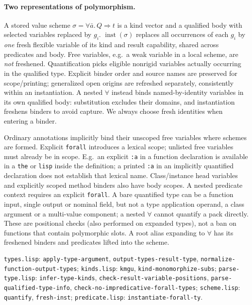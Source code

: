 \documentclass[11pt]{article}
\theoremstyle{definition}
\newcommand{\code}[1]{\texttt{#1}}
\newcommand{\src}[1]{\nolinkurl{#1}}
\begin{document}
\paragraph{Two representations of polymorphism.}
A stored value scheme $\sigma=\forall\bar a.\,Q\Rightarrow t$ is a kind
vector and a qualified body with selected variables replaced by $g_i$.
$\operatorname{inst}(\sigma)$ replaces all occurrences of each $g_i$ by
\emph{one} fresh flexible variable of its kind and result capability, shared
across predicates and body. Free variables, e.g.\ a weak variable in a local
scheme, are \emph{not} freshened. Quantification picks eligible nonrigid
variables actually occurring in the qualified type. Explicit binder order
and source names are preserved for scope/printing; generalized open origins
are refreshed separately, consistently within an instantiation. A nested
$\forall$ instead binds named-by-identity variables in its own qualified body:
substitution excludes their domains, and instantiation freshens binders to
avoid capture. We always choose fresh identities when entering a binder.

Ordinary annotations implicitly bind their unscoped free variables where
schemes are formed. Explicit \code{forall} introduces a lexical scope;
unlisted free variables must already be in scope. E.g.\ an explicit
\code{:a} in a function declaration is available in a \code{the} or
\code{lisp} inside the definition; a printed \code{:a} in an implicitly
quantified declaration does not establish that lexical name. Class/instance
head variables and explicitly scoped method binders also have body scopes.
A nested predicate context requires an explicit \code{forall}. A bare
quantified type can be a function input, single output or nominal field,
but not a type application operand, a class argument or a multi-value
component; a nested $\forall$ cannot quantify a pack directly. These are
positional checks (also performed on expanded types), not a ban on
functions that contain polymorphic slots. A root alias expanding to
$\forall$ has its freshened binders and predicates lifted into the scheme.

\sources \src{types.lisp}: \src{apply-type-argument}, \src{output-types-result-type},
\src{normalize-function-output-types}; \src{kinds.lisp}: \src{kmgu},
\src{kind-monomorphize-subs}; \src{parse-type.lisp}: \src{infer-type-kinds},
\src{check-result-variable-positions}, \src{parse-qualified-type-info},
\src{check-no-impredicative-forall-types}; \src{scheme.lisp}: \src{quantify},
\src{fresh-inst}; \src{predicate.lisp}: \src{instantiate-forall-ty}.
\end{document}
